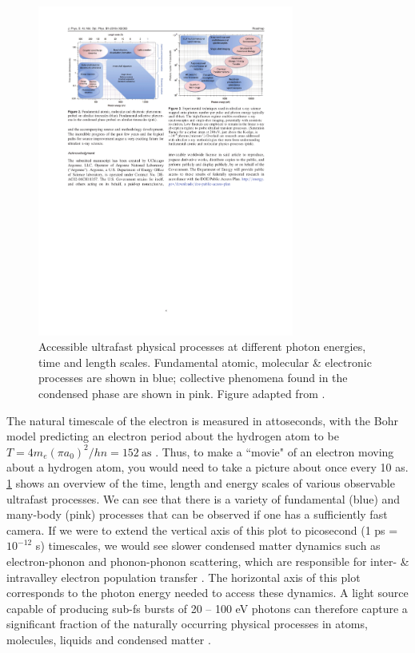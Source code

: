 \begin{figure}
	\centering
	\includegraphics[width=0.75\textwidth]{figures/chap1/physical_process_vs_duration_energy.pdf}
	\caption{Accessible ultrafast physical processes at different photon energies, time and length scales. Fundamental atomic, molecular \& electronic processes are shown in blue; collective phenomena found in the condensed phase are shown in pink. Figure adapted from \cite{youngRoadmapUltrafastXray2018}.}
	\label{fig:physical_process_vs_duration_energy}
\end{figure}

The natural timescale of the electron is measured in attoseconds, with the Bohr model predicting an electron period about the hydrogen atom to be ${T = 4 m_e (\pi a_0)^2 / h n = 152 \ \textrm{as}}$ \cite{changFundamentalsAttosecondOptics2011}. Thus, to make a ``movie" of an electron moving about a hydrogen atom, you would need to take a picture about once every 10 as. \cref{fig:physical_process_vs_duration_energy} shows an overview of the time, length and energy scales of various observable ultrafast processes. We can see that there is a variety of fundamental (blue) and many-body (pink) processes that can be observed if one has a sufficiently fast camera. If we were to extend the vertical axis of this plot to picosecond ({1 ps = $10^{-12}$ s}) timescales, we would see slower condensed matter dynamics such as electron-phonon and phonon-phonon scattering, which are responsible for inter- \& intravalley electron population transfer \cite{zurchDirectSimultaneousObservation2017}. The horizontal axis of this plot corresponds to the photon energy needed to access these dynamics. A light source capable of producing sub-fs bursts of 20 -- 100 eV photons can therefore capture a significant fraction of the naturally occurring physical processes in atoms, molecules, liquids and condensed matter \cite{piconAttosecondXrayTransient2019}.


